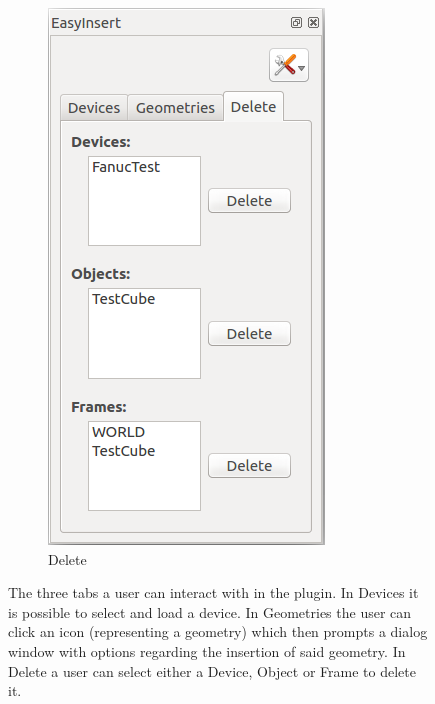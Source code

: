 \begin{figure}[h]
\begin{subfigure}[b]{0.32\textwidth}
                \includegraphics[width=.95\linewidth]{Figures/EasyInsertDelete.png}
  				\caption{Delete}
  				\label{fig:EasyInsertDelete}
        \end{subfigure}%
        \caption{The three tabs a user can interact with in the plugin. In Devices it is possible to select and load a device. In Geometries the user can click an icon (representing a geometry) which then prompts a dialog window with options regarding the insertion of said geometry. In Delete a user can select either a Device, Object or Frame to delete it.}\label{fig:EasyInsertTabs}
\end{figure}

